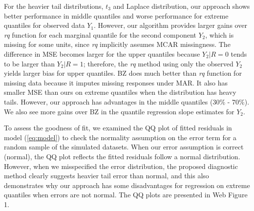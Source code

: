 \documentclass[useAMS,usenatbib,referee]{biom}
\begin{document}
For the heavier tail distributions, $t_3$ and Laplace distribution,
our approach shows better performance in middle quantiles and worse
performance for extreme quantiles for observed data $Y_1$. However,
our algorithm provides larger gains over \textit{rq} function for each
marginal quantile for the second component $Y_2$, which is missing for
some units, since \textit{rq} implicitly assumes MCAR missingness.  The
difference in MSE becomes larger for the upper quantiles because $Y_2
|R = 0$ tends to be larger than $Y_2 | R = 1$; therefore, the
\textit{rq} method using only the observed $Y_2$ yields larger bias
for upper quantiles. BZ does much better than
\textit{rq} function for missing data because it imputes missing
responses under MAR.  It also has smaller MSE than ours on extreme
quantiles when the distribution has heavy tails. However, our approach has
advantages in the middle quantiles (30\% - 70\%).  We also see more
gains over BZ in the quantile regression slope estimates for
$Y_2$.

To assess the goodness of fit, we examined the QQ plot of fitted
residuals in model (\ref{eq:model}) to check the normality assumption
on the error term for a random sample of the simulated datasets.
When our error assumption is correct
(normal), the QQ plot reflects the fitted residuals follow  a
normal distribution. However, when we misspecified the error
distribution, the proposed diagnostic method clearly suggests
heavier tail error than normal, and this also demonstrates why our
approach has some disadvantages for regression on extreme quantiles
when errors are not normal.
The QQ plots are presented in Web Figure 1.
\end{document}
